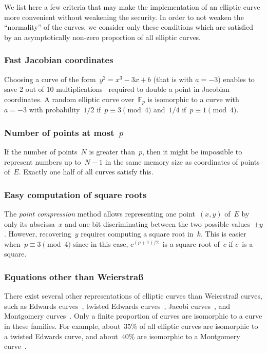 \documentclass[twocolumn,letterpaper]{article}
\def\F{\mathbb{F}}
\begin{document}
We list here a few criteria that
may make the implementation of an elliptic curve more convenient
without weakening the security.
In order to not weaken the ``normality'' of the curves,
we consider only these conditions which are satisfied
by an asymptotically non-zero proportion of all elliptic curves.

\subsubsection{Fast Jacobian coordinates}

Choosing a curve of the form~$y^2 = x^3 - 3 x + b$ (that is with $a=-3$)
enables to save 2 out of 10 multiplications~\cite{ieeep1363}
required to double a point in Jacobian coordinates.
A random elliptic curve over~$\F_p$
is isomorphic to a curve with~$a = -3$
with probability~$1/2$ if~$p ≡ 3 \pmod{4}$ and~$1/4$ if~$p ≡ 1 \pmod{4}$.

\subsubsection{Number of points at most~\texorpdfstring{$p$}{p}}

If the number of points~$N$ is greater than~$p$,
then it might be impossible to represent numbers up to~$N-1$
in the same memory size as coordinates of points of~$E$.
Exactly one half of all curves satisfy this.

\subsubsection{Easy computation of square roots}

The \emph{point compression} method allows representing
one point~$(x,y)$ of~$E$ by only its abscissa~$x$ and
one bit discriminating between the two possible values~$±y$.
However, recovering~$y$ requires computing a square root in~$k$.
This is easier when~$p ≡ 3 \pmod{4}$ since
in this case, $c^{(p+1)/2}$~is a square root of~$c$ if $c$~is a square.

\subsubsection{Equations other than Weierstraß}
\label{sss:other-eq}

There exist several other representations of elliptic curves
than Weierstraß curves, such as
Edwards curves~\cite{ams2007edwards},
twisted Edwards curves~\cite{africa2008bbjl},
Jacobi curves~\cite{aaaaec2003bj},
and Montgomery curves~\cite{mathcomp1987montgomery}.
Only a finite proportion of curves are isomorphic
to a curve in these families.
For example, about~$35\%$ of all elliptic curves
are isomorphic to a twisted Edwards curve,
and about~$40\%$ are isomorphic to a Montgomery curve~\cite{sac2011plut}.
\end{document}

